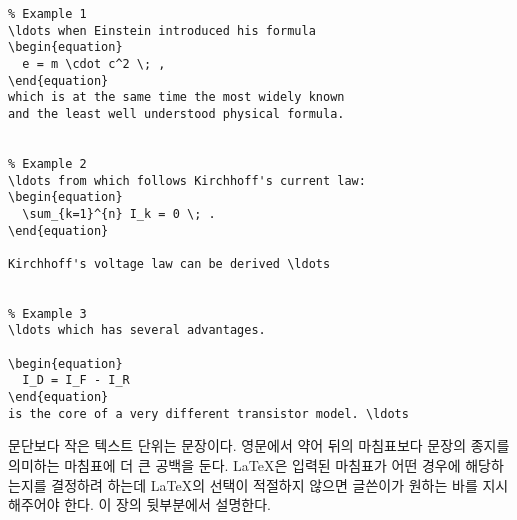 





\begin{code}
\begin{verbatim}
% Example 1
\ldots when Einstein introduced his formula
\begin{equation}
  e = m \cdot c^2 \; ,
\end{equation}
which is at the same time the most widely known
and the least well understood physical formula.


% Example 2
\ldots from which follows Kirchhoff's current law:
\begin{equation}
  \sum_{k=1}^{n} I_k = 0 \; .
\end{equation}

Kirchhoff's voltage law can be derived \ldots


% Example 3
\ldots which has several advantages.

\begin{equation}
  I_D = I_F - I_R
\end{equation}
is the core of a very different transistor model. \ldots
\end{verbatim}
\end{code}


문단보다 작은 텍스트 단위는 문장이다. 영문에서 약어 뒤의 마침표보다 문장의 종지를 의미하는 마침표에
더 큰 공백을 둔다. \LaTeX 은 입력된 마침표가 어떤 경우에 해당하는지를 결정하려 하는데 \LaTeX 의 선택이 
적절하지 않으면 글쓴이가 원하는 바를 지시해주어야 한다. 이 장의 뒷부분에서 설명한다.

